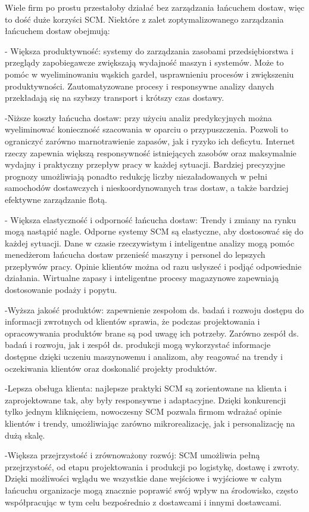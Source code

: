   Wiele firm po prostu przestałoby działać bez zarządzania łańcuchem dostaw, więc to dość duże korzyści SCM.  Niektóre z zalet zoptymalizowanego zarządzania łańcuchem dostaw obejmują: 

   - Większa produktywność: systemy do zarządzania zasobami przedsiębiorstwa i przeglądy zapobiegawcze zwiększają wydajność maszyn i systemów. Może to pomóc w wyeliminowaniu wąskich gardeł, usprawnieniu procesów i zwiększeniu produktywności. Zautomatyzowane procesy i responsywne analizy danych przekładają się na szybszy transport i krótszy czas dostawy.
   
   -Niższe koszty łańcucha dostaw: przy użyciu analiz predykcyjnych można wyeliminować konieczność szacowania w oparciu o przypuszczenia. Pozwoli to ograniczyć zarówno marnotrawienie zapasów, jak i ryzyko ich deficytu. Internet rzeczy zapewnia większą responsywność istniejących zasobów oraz maksymalnie wydajny i praktyczny przepływ pracy w każdej sytuacji. Bardziej precyzyjne prognozy umożliwiają ponadto redukcję liczby niezaładowanych w pełni samochodów dostawczych i nieskoordynowanych tras dostaw, a także bardziej efektywne zarządzanie flotą.
   
   - Większa elastyczność i odporność łańcucha dostaw: Trendy i zmiany na rynku mogą nastąpić nagle. Odporne systemy SCM są elastyczne, aby dostosować się do każdej sytuacji. Dane w czasie rzeczywistym i inteligentne analizy mogą pomóc menedżerom łańcucha dostaw przenieść maszyny i personel do lepszych przepływów pracy. Opinie klientów można od razu usłyszeć i podjąć odpowiednie działania. Wirtualne zapasy i inteligentne procesy magazynowe zapewniają dostosowanie podaży i popytu.
   
   -Wyższa jakość produktów: zapewnienie zespołom ds. badań i rozwoju dostępu do informacji zwrotnych od klientów sprawia, że podczas projektowania i opracowywania produktów brane są pod uwagę ich potrzeby. Zarówno zespół ds. badań i rozwoju, jak i zespół ds. produkcji mogą wykorzystać informacje dostępne dzięki uczeniu maszynowemu i analizom, aby reagować na trendy i oczekiwania klientów oraz doskonalić projekty produktów.
    
    -Lepsza obsługa klienta: najlepsze praktyki SCM są zorientowane na klienta i zaprojektowane tak, aby były responsywne i adaptacyjne. Dzięki konkurencji tylko jednym kliknięciem, nowoczesny SCM pozwala firmom wdrażać opinie klientów i trendy, umożliwiając zarówno mikrorealizację, jak i personalizację na dużą skalę.
    
    -Większa przejrzystość i zrównoważony rozwój: SCM umożliwia pełną przejrzystość, od etapu projektowania i produkcji po logistykę, dostawę i zwroty. Dzięki możliwości wglądu we wszystkie dane wejściowe i wyjściowe w całym łańcuchu organizacje mogą znacznie poprawić swój wpływ na środowisko, często współpracując w tym celu bezpośrednio z dostawcami i innymi dostawcami. \cite{scm2023}

